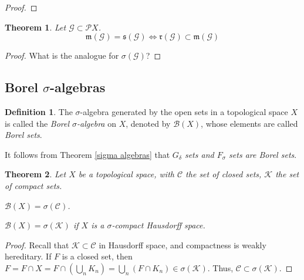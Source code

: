 \documentclass[11pt, a4paper, openany]{book}
\newtheorem{thm}{Theorem}\newtheorem{lem}{Lemma}\newtheorem{crl}{Corollary}
\theoremstyle{definition}
\newtheorem{define}{Definition}\newtheorem{exam}{Example}\newtheorem{remark}{Remark}
\newenvironment{tight_enumerate}{\begin{enumerate}\itemsep -0.2em}{\end{enumerate}}
\begin{document}
    \begin{proof}
        
    \end{proof}
    \begin{thm}
        Let $\mathscr{G}\subset\mathscr{P}X$.
        \[
            \mathfrak{m}(\mathscr{G})=\mathfrak{s}(\mathscr{G})\Longleftrightarrow \mathfrak{r}(\mathscr{G})\subset\mathfrak{m}(\mathscr{G})
        \]
    \end{thm}
    \begin{proof}
        What is the analogue for $\sigma(\mathscr{G})$?
    \end{proof}
\subsection{Borel \texorpdfstring{$\sigma$}{sigma}-algebras}
    \begin{define}
        The $\sigma$-algebra generated by the open sets in a topological space $X$ is called the \textit{Borel $\sigma$-algebra} on $X$, denoted by $\mathscr{B}(X)$, whose elements are called \textit{Borel sets}.
    \end{define}
    It follows from Theorem \ref{sigma algebras} that \textit{$G_\delta$ sets and $F_\sigma$ sets are Borel sets}.
    \begin{thm}\label{generators of a Borel sigma algebra}
        Let $X$ be a topological space, with $\mathscr{C}$ the set of closed sets, $\mathscr{K}$ the set of compact sets.
        \begin{tight_enumerate}
            \item $\mathscr{B}(X)=\sigma(\mathscr{C})$.
            \item $\mathscr{B}(X)=\sigma(\mathscr{K})$ if $X$ is a $\sigma$-compact Hausdorff space.
        \end{tight_enumerate}
    \end{thm}
    \begin{proof}
        Recall that $\mathscr{K}\subset \mathscr{C}$ in Hausdorff space, and compactness is weakly hereditary. If $F$ is a closed set, then $F=F\cap X=F\cap (\bigcup_{n}K_n)=\bigcup_n(F\cap K_n)\in\sigma(\mathscr{K})$. Thus, $\mathscr{C}\subset\sigma(\mathscr{K})$.
    \end{proof}
\end{document}
